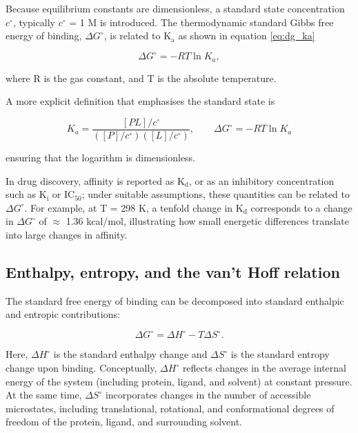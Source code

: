 \documentclass[12pt]{article}
\begin{document}
Because equilibrium constants are dimensionless, a standard state concentration $c^\circ$, typically $c^\circ$ = 1 M is introduced. The thermodynamic standard Gibbs free energy of binding, $\Delta G^\circ$, is related to $\textrm{K}_\textrm{a}$ as shown in equation \ref{eq:dg_ka}

\begin{equation}
    \Delta G^\circ = -RT \ln K_a,
\label{eq:dg_ka}
\end{equation}

where R is the gas constant, and T is the absolute temperature.\cite{CH3_DillBromberg,CH3_AtkinsDePaula} 

A more explicit definition that emphasises the standard state is

\begin{equation}
    K_a = \frac{[PL]/c^\circ}{([P]/c^\circ)([L]/c^\circ)}, \qquad
    \Delta G^\circ = -RT \ln K_a
\label{eq:dg_ka_ext}
\end{equation}

ensuring that the logarithm is dimensionless.

In drug discovery, affinity is reported as $\textrm{K}_\textrm{d}$, or as an inhibitory concentration such as $\textrm{K}_\textrm{i}$ or $\textrm{IC}_{\textrm{50}}$; under suitable assumptions, these quantities can be related to $\Delta G^\circ$\cite{CH3_GilsonZhou2007}. For example, at T = 298 K, a tenfold change in $\textrm{K}_\textrm{d}$ corresponds to a change in $\Delta G^\circ$ of $\approx$ 1.36 kcal/mol, illustrating how small energetic differences translate into large changes in affinity.

\subsection{Enthalpy, entropy, and the van't Hoff relation}

The standard free energy of binding can be decomposed into standard enthalpic and entropic contributions:

\begin{equation}
    \Delta G^\circ = \Delta H^\circ - T \Delta S^\circ.
\label{eq:gibbs_eq}
\end{equation}

Here, $\Delta H^\circ$ is the standard enthalpy change and $\Delta S^\circ$ is the standard entropy change upon binding.\cite{CH3_DillBromberg} Conceptually, $\Delta H^\circ$ reflects changes in the average internal energy of the system (including protein, ligand, and solvent) at constant pressure. At the same time, $\Delta S^\circ$ incorporates changes in the number of accessible microstates, including translational, rotational, and conformational degrees of freedom of the protein, ligand, and surrounding solvent.
\end{document}
